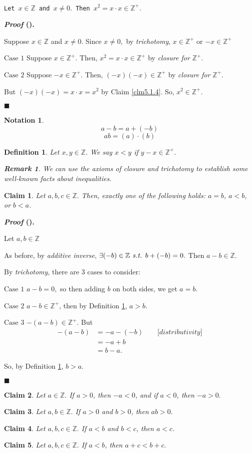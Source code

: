 \documentclass[12pt,a4paper]{article}
\newtheorem{nota}{Notation}[section]
\newtheorem{df}{Definition}[subsection]
\newtheorem{clm}{Claim}[subsection]
\newcounter{nprf}[subsection]
\newtheorem*{rmk}{\indent Remark}
\newenvironment*{prf}{\par\indent\textbf{\textit{Proof} (\stepcounter{nprf}\thenprf). }\par }{\par\hfill $\blacksquare$\par}
\def\Z{{\mathbb{Z}}}
\def\Zp{{\Z^{+}}}
\def\st{\emph{ s.t. }}
\begin{document}
\begin{framed}
\noindent\texttt{Let $x\in\Z$ and $x\neq0.$ Then $x^2=x\cdot x\in\Zp.$} \label{Problem1}
\begin{prf}
	Suppose $x\in\Z$ and $x\neq0$. Since $x\neq0,$ by \textit{trichotomy}, $x\in\Zp$ or $-x\in\Zp$\par$\boxed{\text{Case }1}$ Suppose $x\in\Zp.$ Then, $x^2=x\cdot x\in\Zp$ by \textit{closure for $\Zp$}.\par$\boxed{\text{Case }2}$ Suppose $-x\in\Zp.$ Then, $(-x)(-x)\in\Zp$ by \textit{closure for $\Zp$}.\par\hspace{5mm}But $(-x)(-x)=x\cdot x=x^2$ by Claim \ref{clm5.1.4}. So, $x^2\in\Zp.$
\end{prf}	
\end{framed}
\begin{nota}
	\[a-b=a+(-b)\]\[ab=(a)\cdot(b)\]
\end{nota}
\begin{df}\label{df5.1.2}
	Let $x,y\in\Z$. We say $x<y$ if $y-x\in\Zp.$
	\begin{rmk} We can use the axioms of closure and trichotomy to establish some well-known facts about inequalities. \end{rmk}
\end{df}
\begin{framed}
\begin{clm}
	Let $a,b,c\in\Z.$ Then, exactly one of the following holds: $a=b$, $a<b$, or $b<a$.
\end{clm}
	\begin{prf}
		Let $a,b\in\Z$\par As before, by \textit{additive inverse}, $\exists(-b)\in\Z\st b+(-b)=0.$ Then $a-b\in\Z.$\par By \textit{trichotomy}, there are 3 cases to consider:\par$\boxed{\text{Case }1}$ $a-b=0,$ so then adding $b$ on both sides, we get $a=b.$\par $\boxed{\text{Case }2}$ $a-b\in\Zp$, then by Definition \ref{df5.1.2}, $a>b$.\par $\boxed{\text{Case }3}$ $-(a-b)\in\Zp.$ But \[\begin{aligned}-(a-b)&=-a-(-b)\qquad\big[\textit{distributivity}\big]\\&=-a+b\\&=b-a.\end{aligned}\]\par\hspace{5mm}So, by Definition \ref{df5.1.2}, $b>a.$
	\end{prf}
\end{framed}
\begin{clm}
	Let $a\in\Z.$ If $a>0$, then $-a<0$, and if $a<0$, then $-a>0.$	
\end{clm}
\begin{clm}
	Let $a,b\in\Z.$ If $a>0$ and $b>0$, then $ab>0.$
\end{clm}
\begin{clm}
	Let $a,b,c\in\Z.$ If $a<b$ and $b<c$, then $a<c$.
\end{clm}
\begin{clm}
	Let $a,b,c\in\Z.$ If $a<b$, then $a+c<b+c.$
\end{clm}
\end{document}
